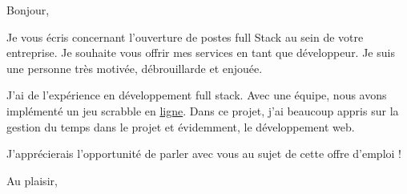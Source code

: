 \documentclass[12pt,french]{letter}
\begin{document}
\pagestyle{headings}

\begin{letter}{}
\address{Montréal, Canada}

\opening{Bonjour,}



Je vous écris concernant l'ouverture de postes full Stack au sein de votre entreprise. Je souhaite vous offrir mes services en tant que développeur.
Je suis une personne très motivée, débrouillarde et enjouée. 

J'ai de l'expérience en développement full stack. Avec une équipe, nous avons implémenté un jeu scrabble en \href{http://maximelaroche.gitlab.io/log2990-201/#/home}{ligne}. Dans ce projet, j'ai beaucoup appris sur la gestion du temps dans le projet et évidemment, le développement web. 


J'apprécierais l'opportunité de parler avec vous au sujet de cette offre d'emploi !

\signature{Maxime}

\closing{Au plaisir,}


\end{letter}
\end{document}
